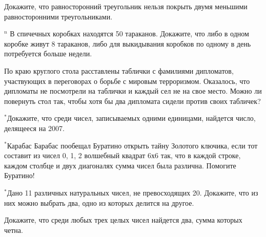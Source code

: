 \begin{thm}
	Докажите, что равносторонний треугольник нельзя покрыть двумя меньшими равносторонними треугольниками.
\end{thm}

\begin{thm}\label{2.13}
	$^n$ В спичечных коробках находятся 50 тараканов. Докажите, что либо в одном коробке живут 8 тараканов, либо для выкидывания коробков по одному в день потребуется больше недели.
\end{thm}
%

\begin{thm}
	По краю круглого стола расставлены таблички с фамилиями дипломатов, участвующих в переговорах о борьбе с мировым терроризмом. Оказалось, что дипломаты не посмотрели на таблички и каждый сел не на свое место. Можно ли повернуть стол так, чтобы хотя бы два дипломата сидели против своих табличек?
\end{thm}

\begin{thm}
	$^\ast$Докажите, что среди чисел, записываемых одними единицами, найдется число, делящееся на 2007.
\end{thm}

\begin{thm}
	$^\ast$Карабас Барабас пообещал Буратино открыть тайну Золотого ключика, если тот составит из чисел 0, 1, 2 волшебный квадрат 6х6 так, что в каждой строке, каждом столбце и двух диагоналях сумма чисел была различна. Помогите Буратино!
\end{thm}

\begin{thm}
	$^\ast$Дано 11 различных натуральных чисел, не превосходящих 20. Докажите, что из них можно выбрать два, одно из которых делится на другое. 
\end{thm}

\begin{thm}
	Докажите, что среди любых трех целых чисел найдется два, сумма которых четна.
\end{thm}

